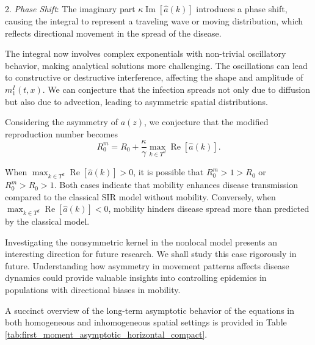\documentclass[sn-basic]{sn-jnl}%
\theoremstyle{thmstyleone}%
\theoremstyle{thmstyletwo}%
\theoremstyle{thmstylethree}%
\numberwithin{equation}{theorem}
\begin{document}
2. \textit{Phase Shift}: The imaginary part $\kappa \operatorname{Im}[\hat{a}(k)]$ introduces a phase shift, causing the integral to represent a traveling wave or moving distribution, which reflects directional movement in the spread of the disease.


The integral now involves complex exponentials with non-trivial oscillatory behavior, making analytical solutions more challenging. The oscillations can lead to constructive or destructive interference, affecting the shape and amplitude of $m_1^I(t, x)$. We can conjecture that the infection spreads not only due to diffusion but also due to advection, leading to asymmetric spatial distributions.

Considering the asymmetry of $a(z)$, we conjecture that the modified reproduction number becomes
$$
R_0^m=R_0+\frac{\kappa}{\gamma} \max _{k \in T^d} \operatorname{Re}[\hat{a}(k)].
$$


When $\max _{k \in T^d} \operatorname{Re}[\hat{a}(k)]>0$, it is possible that $R_0^m>1>R_0$ or $R_0^m>R_0>1$. Both cases indicate that mobility enhances disease transmission compared to the classical SIR model without mobility. Conversely, when $\max _{k \in T^d} \operatorname{Re}[\hat{a}(k)]<0$, mobility hinders disease spread more than predicted by the classical model.

Investigating the nonsymmetric kernel in the nonlocal model presents an interesting direction for future research. We shall study this case rigorously in future. Understanding how asymmetry in movement patterns affects disease dynamics could provide valuable insights into controlling epidemics in populations with directional biases in mobility.





A succinct overview of the long-term asymptotic behavior of the equations in both homogeneous and inhomogeneous spatial settings is provided in Table \ref{tab:first_moment_asymptotic_horizontal_compact}.
\end{document}
